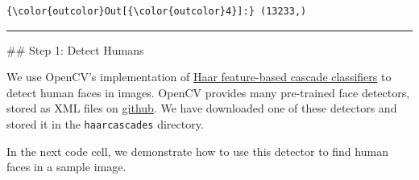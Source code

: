 \documentclass[11pt]{article}
\begin{document}
\begin{Verbatim}[commandchars=\\\{\}]
{\color{outcolor}Out[{\color{outcolor}4}]:} (13233,)
\end{Verbatim}
            
    \begin{center}\rule{0.5\linewidth}{\linethickness}\end{center}

 \#\# Step 1: Detect Humans

We use OpenCV's implementation of
\href{http://docs.opencv.org/trunk/d7/d8b/tutorial_py_face_detection.html}{Haar
feature-based cascade classifiers} to detect human faces in images.
OpenCV provides many pre-trained face detectors, stored as XML files on
\href{https://github.com/opencv/opencv/tree/master/data/haarcascades}{github}.
We have downloaded one of these detectors and stored it in the
\texttt{haarcascades} directory.

In the next code cell, we demonstrate how to use this detector to find
human faces in a sample image.
\end{document}
